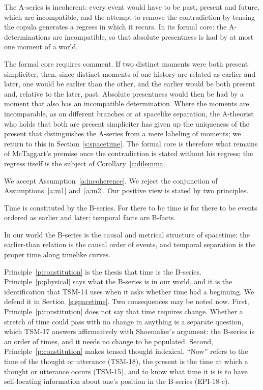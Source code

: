 \documentclass{situationist-preprint}
\begin{document}
\begin{assumption}[Incoherence]\label{a:incoherence}
The A-series is incoherent: every event would have to be past, present and future, which are incompatible, and the attempt to remove the contradiction by tensing the copula generates a regress in which it recurs. In its formal core: the A-determinations are incompatible, so that absolute presentness is had by at most one moment of a world.
\end{assumption}

The formal core requires comment. If two distinct moments were both present simpliciter, then, since distinct moments of one history are related as earlier and later, one would be earlier than the other, and the earlier would be both present and, relative to the later, past. Absolute presentness would then be had by a moment that also has an incompatible determination. Where the moments are incomparable, as on different branches or at spacelike separation, the A-theorist who holds that both are present simpliciter has given up the uniqueness of the present that distinguishes the A-series from a mere labeling of moments; we return to this in Section~\ref{s:spacetime}. The formal core is therefore what remains of McTaggart's premise once the contradiction is stated without his regress; the regress itself is the subject of Corollary~\ref{c:dilemma}.

We accept Assumption~\ref{a:incoherence}. We reject the conjunction of Assumptions~\ref{a:m1} and~\ref{a:m2}. Our positive view is stated by two principles.

\begin{principle}[Constitution]\label{p:constitution}
Time is constituted by the B-series. For there to be time is for there to be events ordered as earlier and later; temporal facts are B-facts.
\end{principle}

\begin{principle}\label{p:physical}
In our world the B-series is the causal and metrical structure of spacetime: the earlier-than relation is the causal order of events, and temporal separation is the proper time along timelike curves.
\end{principle}

Principle~\ref{p:constitution} is the thesis that time is the B-series. Principle~\ref{p:physical} says what the B-series is in our world, and it is the identification that TSM-14 uses when it asks whether time had a beginning. We defend it in Section~\ref{s:spacetime}. Two consequences may be noted now. First, Principle~\ref{p:constitution} does not say that time requires change. Whether a stretch of time could pass with no change in anything is a separate question, which TSM-17 answers affirmatively with Shoemaker's argument: the B-series is an order of times, and it needs no change to be populated. Second, Principle~\ref{p:constitution} makes tensed thought indexical. \enquote{Now} refers to the time of the thought or utterance (TSM-18), the present is the time at which a thought or utterance occurs (TSM-15), and to know what time it is is to have self-locating information about one's position in the B-series (EPI-18-c).
\end{document}
